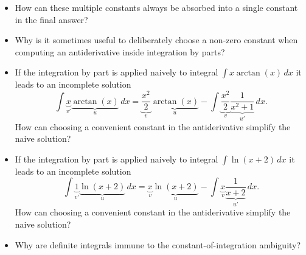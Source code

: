 \begin{itemize}
\item How can these multiple constants always be absorbed into a single constant in the final answer?

\item Why is it sometimes useful to deliberately choose a non-zero constant when computing an antiderivative inside integration by parts?

\item If the integration by part is applied naively to integral $\int x\arctan(x) \, dx$ it leads to an incomplete solution
  \[
    \int \underbrace{x}_{v'} \underbrace{\arctan(x)}_{u} \, dx
      = \underbrace{\frac{x^2}{2}}_{v} \underbrace{\arctan(x)}_{u} -
        \int \underbrace{\frac{x^2}{2}}_{v} \underbrace{\frac{1}{x^2+1}}_{u'}\,dx.
  \]
  How can choosing a convenient constant in the antiderivative simplify the naive solution?

\item If the integration by part is applied naively to integral $\int \ln(x+2) \, dx$ it leads to an incomplete solution
  \[
    \int \underbrace{1}_{v'} \underbrace{\ln(x+2)}_{u} \, dx
      = \underbrace{x}_{v} \underbrace{\ln(x+2)}_{u} -
        \int \underbrace{x}_{v} \underbrace{\frac{1}{x+2}}_{u'} \, dx.
  \]
  How can choosing a convenient constant in the antiderivative simplify the naive solution?

\item Why are definite integrals immune to the constant-of-integration ambiguity?

\end{itemize}
